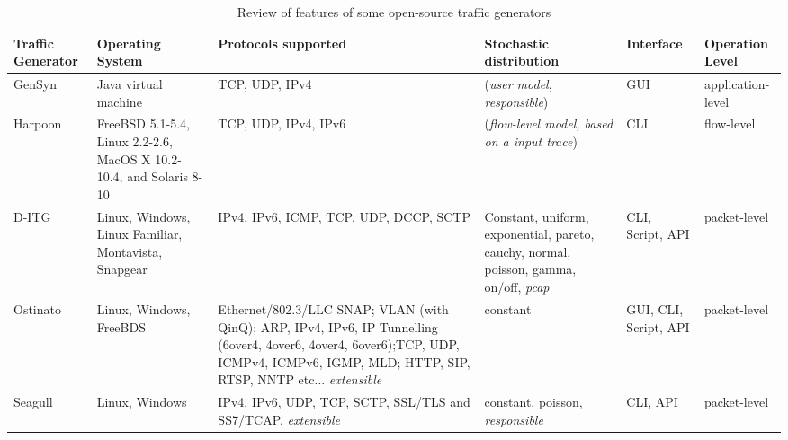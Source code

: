 \renewcommand{\tabularxcolumn}[1]{>{\small}m{#1}}


\begin{table}[t!]
\caption{Review of features of some open-source traffic generators}
\begin{center}
\begin{footnotesize}
\begin{tabularx}{\linewidth}{
|>{\hsize=0.9\hsize\raggedright\arraybackslash}X	%
|>{\hsize=1.16\hsize\centering\arraybackslash}X					%
>{\hsize=1.37\hsize\centering\arraybackslash}X					%
>{\hsize=1.16\hsize\centering\arraybackslash}X					%
>{\hsize=0.7\hsize\centering\arraybackslash}X					%
>{\hsize=0.7\hsize\centering\arraybackslash}X|					%
}
	\hline
	\textbf{Traffic Generator} & 
    \textbf{Operating System} & 
    \textbf{Protocols supported} & 
    \textbf{Stochastic distribution} & 
    \textbf{Interface} & 
    \textbf{Operation Level} \\
    
    \hline
    GenSyn	&
    Java virtual machine &
    TCP, UDP, IPv4 &
    (\textit{user model}, \textit{responsible}) &
    GUI &
    application-level \\
    			
    \hline
    Harpoon &
    FreeBSD 5.1-5.4, Linux 2.2-2.6, MacOS X 10.2-10.4, and Solaris 8-10 &
    TCP, UDP, IPv4, IPv6 &
    (\textit{flow-level model, based on a input trace})&
    CLI &
    flow-level\\    

    \hline
    D-ITG &
    Linux, Windows, Linux Familiar, Montavista, Snapgear &
    IPv4, IPv6, ICMP, TCP, UDP, DCCP, SCTP &
    Constant, uniform, exponential, pareto, cauchy, normal, poisson, gamma, on/off, \textit{pcap}&
    CLI, Script, API &
    packet-level \\
    
    \hline
    Ostinato &
    Linux, Windows, FreeBDS &
    Ethernet/802.3/LLC SNAP; VLAN (with QinQ); ARP, IPv4, IPv6, IP Tunnelling (6over4, 4over6, 4over4, 6over6);TCP, UDP, ICMPv4, ICMPv6, IGMP, MLD; HTTP, SIP, RTSP, NNTP etc... \textit{extensible}&
    constant &
    GUI, CLI, Script, API &
    packet-level\\
	 		
    \hline
    Seagull&
    Linux, Windows &
    IPv4, IPv6, UDP, TCP, SCTP, SSL/TLS and SS7/TCAP. \textit{extensible}&
    constant, poisson, \textit{responsible} &
    CLI, API &
    packet-level\\




\end{tabularx}
\end{footnotesize}
\end{center}
\end{table}
